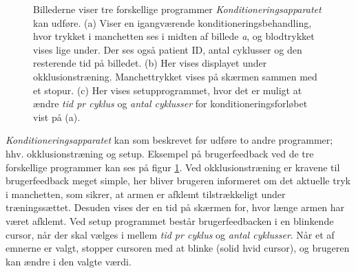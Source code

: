 \begin{figure}[H]
\centering
{}
\caption{Billederne viser tre forskellige programmer \textit{Konditioneringsapparatet} kan udføre. (a) Viser en igangværende konditioneringsbehandling, hvor trykket i manchetten ses i midten af billede \textit{a}, og blodtrykket vises lige under. Der ses også patient ID, antal cyklusser og den resterende tid på billedet. (b) Her vises displayet under okklusionstræning. Manchettrykket vises på skærmen sammen med et stopur. (c) Her vises setupprogrammet, hvor det er muligt at ændre \textit{tid pr cyklus} og \textit{antal cyklusser} for konditioneringsforløbet vist på (a).}\label{fig:interface}
\end{figure}

\textit{Konditioneringsapparatet} kan som beskrevet før udføre to andre programmer; hhv. okklusionstræning og setup. Eksempel på brugerfeedback ved de tre forskellige programmer kan ses på figur \ref{fig:interface}. Ved okklusionstræning er kravene til brugerfeedback meget simple, her bliver brugeren informeret om det aktuelle tryk i manchetten, som sikrer, at armen er afklemt tilstrækkeligt under træningssættet. Desuden vises der en tid på skærmen for, hvor længe armen har været afklemt. Ved setup programmet består brugerfeedbacken i en blinkende cursor, når der skal vælges i mellem \textit{tid pr cyklus} og \textit{antal cyklusser}. Når et af emnerne er valgt, stopper cursoren med at blinke (solid hvid cursor), og brugeren kan ændre i den valgte værdi.

